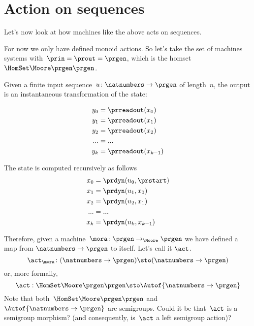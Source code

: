 \section{Action on sequences}

Let's now look at how machines like the above acts on sequences. 

For now we only have defined monoid actions. So let's take the set of machines systems with~$\prin = \prout = \prgen$, which is the homset~$\HomSet\Moore\prgen\prgen$.

Given a finite input sequence~$u\colon \natnumbers \to \prgen$ of length~$n$, the output is an instantaneous transformation of the state:

\begin{equation}
  \begin{aligned}
  y_0 &= \prreadout(x_0) \\ 
  y_1 &= \prreadout(x_1) \\ 
  y_2 &= \prreadout(x_2) \\ 
  ... &= ...  \\
  y_{k} &= \prreadout(x_{k-1}) 
\end{aligned} 
\end{equation}

The state is computed recursively as follows 
\begin{equation}
  \begin{aligned}
  x_0 &= \prdyn(u_0, \prstart) \\ 
  x_1 &= \prdyn(u_1, x_0) \\ 
  x_2 &= \prdyn(u_2, x_1) \\ 
  ... &= ... \\
  x_{k} &= \prdyn(u_{k}, x_{k-1}) 
  \end{aligned}
\end{equation}

Therefore, given a machine~$\mora \colon \prgen \to_{\Moore} \prgen$ we have defined a map from $\natnumbers \to \prgen$ to itself. Let's call it $\act$.
% 
\begin{equation}
\act_{\mora}\colon  (\natnumbers \to \prgen)  \sto  (\natnumbers \to \prgen)
\end{equation}
% 
or, more formally,
% 
  \begin{equation}
    \act: \HomSet\Moore\prgen\prgen \sto \Autof {\natnumbers \to \prgen}
\end{equation}
%
Note that both~$\HomSet\Moore\prgen\prgen$ and $\Autof {\natnumbers \to \prgen}$ are semigroups.
Could it be that~$\act$ is a semigroup morphism? (and consequently, is~$\act$ a left semigroup action)?

